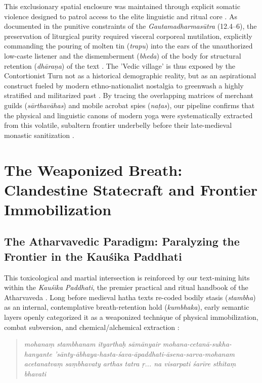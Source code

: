 \documentclass[11pt,twoside,letterpaper]{article}
\begin{document}
This exclusionary spatial enclosure was maintained through explicit somatic violence designed to patrol access to the elite linguistic and ritual core \citep{McCartney2026}. As documented in the punitive constraints of the \textit{Gautamadharmasūtra} (12.4–6), the preservation of liturgical purity required visceral corporeal mutilation, explicitly commanding the pouring of molten tin (\textit{trapu}) into the ears of the unauthorized low-caste listener and the dismemberment (\textit{bheda}) of the body for structural retention (\textit{dhāraṇa}) of the text \citep{McCartney2026}. The 'Vedic village' is thus exposed by the Contortionist Turn not as a historical demographic reality, but as an aspirational construct fueled by modern ethno-nationalist nostalgia to greenwash a highly stratified and militarized past \citep{McCartney2026}. By tracing the overlapping matrices of merchant guilds (\textit{sārthavāhas}) and mobile acrobat spies (\textit{naṭas}), our pipeline confirms that the physical and linguistic canons of modern yoga were systematically extracted from this volatile, subaltern frontier underbelly before their late-medieval monastic sanitization \citep{McCartney2026}.

\section{The Weaponized Breath: Clandestine Statecraft and Frontier Immobilization}

\subsection{The Atharvavedic Paradigm: Paralyzing the Frontier in the Kauśika Paddhati}
This toxicological and martial intersection is reinforced by our text-mining hits within the \textit{Kauśika Paddhati}, the premier practical and ritual handbook of the Atharvaveda \citep{KausP}. Long before medieval hatha texts re-coded bodily stasis (\textit{stambha}) as an internal, contemplative breath-retention hold (\textit{kumbhaka}), early semantic layers openly categorized it as a weaponized technique of physical immobilization, combat subversion, and chemical/alchemical extraction \citep{Birch2024, KausP}:

\begin{quote}
\small
\textit{mohanaṃ stambhanam ityarthaḥ sāmānyair mohana-cetanā-sukha-hanyante 'sānty-ābhaya-hasta-śava-āpaddhati-āsena-sarva-mohanam acetanatvaṃ saṃbhavaty arthas tatra ṛ... na visarpati śarīre sthitaṃ bhavati }
\end{quote}
\end{document}
